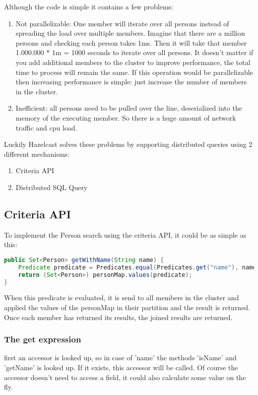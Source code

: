 Although the code is simple it contains a few problems:
\begin{enumerate}
\item Not parallelizable: One member will iterate over all persons instead of spreading the load over multiple members. Imagine that there are a million persons and checking each person takes 1ms. Then it will take that member 1.000.000 * 1m = 1000 seconds to iterate over all persons. It doesn't matter if you add additional members to the cluster to improve performance, the total time to process will remain the same. If this operation would be parallelizable then increasing performance is simple: just increase the number of members in the cluster. 
\item Inefficient: all persons need to be pulled over the line, deserialized into the memory of the executing member. So there is a huge amount of network traffic and cpu load.
\end{enumerate}

Luckily Hazelcast solves these problems by supporting distributed queries using 2 different mechanisms:
\begin{enumerate}
\item Criteria API
\item Distributed SQL Query
\end{enumerate}

\subsection{Criteria API}
To implement the Person search using the criteria API, it could be as simple as this:
\begin{lstlisting}[language=java]
public Set<Person> getWithName(String name) {
    Predicate predicate = Predicates.equal(Predicates.get("name"), name);
    return (Set<Person>) personMap.values(predicate);
}
\end{lstlisting}
When this predicate is evaluated, it is send to all members in the cluster and applied the values of the personMap in their partition and the result is returned. Once each member has returned its results, the joined results are returned.

\subsubsection{The get expression}
first an accessor is looked up, so in case of 'name' the methods 'isName' and 'getName' is looked up. If it exists, this accessor will be called. Of course the accessor doesn't need to access a field, it could also calculate some value on the fly. 

